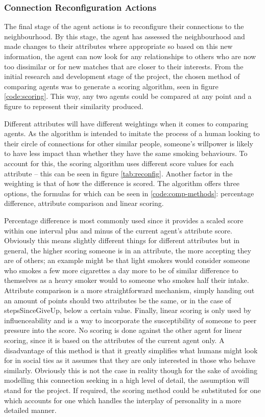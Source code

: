 \documentclass[]{report}
\begin{document}
\subsubsection{Connection Reconfiguration Actions}

The final stage of the agent actions is to reconfigure their connections to the neighbourhood. By this stage, the agent has assessed the neighbourhood and made changes to their attributes where appropriate so based on this new information, the agent can now look for any relationships to others who are now too dissimilar or for new matches that are closer to their interests. From the initial research and development stage of the project, the chosen method of comparing agents was to generate a scoring algorithm, seen in figure \ref{code:scoring}. This way, any two agents could be compared at any point and a figure to represent their similarity produced.

Different attributes will have different weightings when it comes to comparing agents. As the algorithm is intended to imitate the process of a human looking to their circle of connections for other similar people, someone's willpower is likely to have less impact than whether they have the same smoking behaviours. To account for this, the scoring algorithm uses different score values for each attribute – this can be seen in figure \ref{tab:reconfig}. Another factor in the weighting is that of how the difference is scored. The algorithm offers three options, the formulas for which can be seen in \ref{code:comp-methods}: percentage difference, attribute comparison and linear scoring.

Percentage difference is most commonly used since it provides a scaled score within one interval plus and minus of the current agent's attribute score. Obviously this means slightly different things for different attributes but in general, the higher scoring someone is in an attribute, the more accepting they are of others; an example might be that light smokers would consider someone who smokes a few more cigarettes a day more to be of similar difference to themselves as a heavy smoker would to someone who smokes half their intake. Attribute comparison is a more straightforward mechanism, simply handing out an amount of points should two attributes be the same, or in the case of stepsSinceGiveUp, below a certain value. Finally, linear scoring is only used by influenceability and is a way to incorporate the susceptibility of someone to peer pressure into the score. No scoring is done against the other agent for linear scoring, since it is based on the attributes of the current agent only. A disadvantage of this method is that it greatly simplifies what humans might look for in social ties as it assumes that they are only interested in those who behave similarly. Obviously this is not the case in reality though for the sake of avoiding modelling this connection seeking in a high level of detail, the assumption will stand for the project. If required, the scoring method could be substituted for one which accounts for one which handles the interplay of personality in a more detailed manner.
\end{document}
